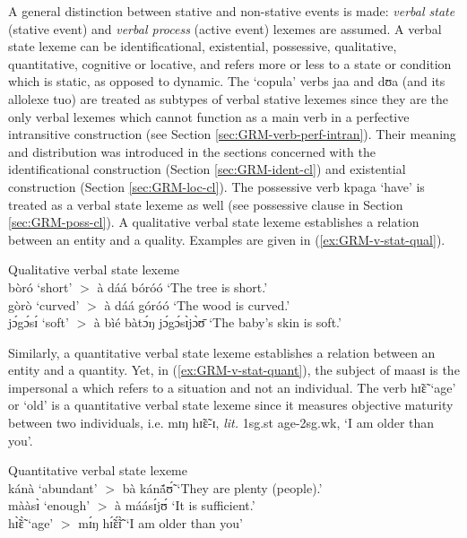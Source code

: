 \begin{exe}
\begin{exe}
\begin{exe}
\begin{exe}
\begin{exe}
\begin{exe}
\begin{exe}
\begin{exe}
\begin{exe}
\begin{exe}
\begin{exe}
A general distinction
between stative and non-stative events  is made: {\it verbal state} (stative
event) and {\it verbal process} (active event) 
lexemes are assumed. A verbal state lexeme can be identificational,
existential, possessive,  qualitative, quantitative, cognitive or  locative, and
refers more or less to a state or condition which is static, as opposed to
dynamic. The `copula' verbs {\sls jaa} and {\sls dʊa} (and its allolexe {\sls 
tuo})
are treated as subtypes of verbal stative lexemes since they are the only verbal
lexemes which cannot function as a main verb in  a perfective intransitive
construction (see Section \ref{sec:GRM-verb-perf-intran}). Their meaning and
distribution was introduced in the sections concerned with the identificational
construction (Section \ref{sec:GRM-ident-cl}) and existential construction
(Section \ref{sec:GRM-loc-cl}).  The possessive verb
{\sls kpaga} `have'  is treated as  a verbal state lexeme as well (see 
possessive
clause in Section   \ref{sec:GRM-poss-cl}).  A qualitative verbal state lexeme
establishes a relation between an entity and a quality. Examples are given in
(\ref{ex:GRM-v-stat-qual}).


\ea\label{ex:GRM-v-stat-qual}{\rm Qualitative verbal state lexeme}\\

 {\sls bòró}  {\rm `short'}  $>$ {\sls à dáá bóróó} {\rm  `The tree is short.'}\\
{\sls gòrò} {\rm `curved'}  $>$ {\sls à dáá góróó} {\rm  `The wood is curved.'}\\
{\sls jɔ́gɔ́sɪ́} {\rm `soft'}   $>$ {\sls   à bìé bàtɔ́ŋ jɔ́gɔ́sɪ̀jɔ̀ʊ̄} {\rm    `The 
baby's
skin is soft.'}
\z

Similarly, a quantitative verbal state lexeme  establishes a relation between an entity and a quantity. Yet, in (\ref{ex:GRM-v-stat-quant}), the subject of   {\sls maasɪ} is the impersonal  {\sls a} which refers to a situation and not an individual. The verb {\sls hɪ̃ɛ̃}  `age' or `old'  is a quantitative verbal state lexeme since it  measures  objective maturity between two individuals, i.e. {\sls mɪŋ hɪ̃ɛ̃-ɪ}, {\it lit.} {\sc 1sg.st} age-{\sc 2sg.wk}, `I am older than you'. 


\ea\label{ex:GRM-v-stat-quant}{\rm Quantitative verbal state lexeme}\\

 {\sls kánà} {\rm  `abundant'}  $>$ {\sls bà kánã́ʊ̃́} {\rm   `They are plenty 
(people).'} 
\\
{\sls mààsɪ̀} {\rm `enough'}  $>$   {\sls à máásɪ́jʊ́} {\rm    `It is sufficient.'}\\
{\sls hɪ̃̀ɛ̃̀} {\rm `age'} $>$ {\sls mɪ́ŋ hɪ̃́ɛ̃́ɪ̃̀} {\rm    `I am older than you'}
\z


\end{exe}
\end{exe}
\end{exe}
\end{exe}
\end{exe}
\end{exe}
\end{exe}
\end{exe}
\end{exe}
\end{exe}
\end{exe}
